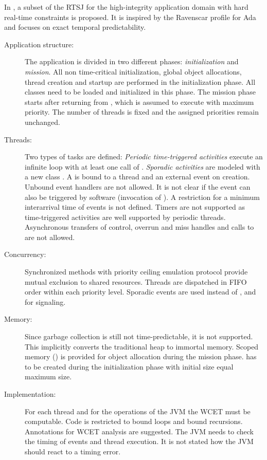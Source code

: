 In \cite{Pusch01}, a subset of the RTSJ for the high-integrity
application domain with hard real-time constraints is proposed. It
is inspired by the Ravenscar profile for Ada \cite{289525} and
focuses on exact temporal predictability.
%
\begin{description}
\item[Application structure:] The application is divided in two
different phases: \textit{initialization} and \textit{mission}. All
non time-critical initialization, global object allocations, thread
creation and startup are performed in the initialization phase. All
classes need to be loaded and initialized in this phase. The mission
phase starts after returning from , which is assumed to
execute with maximum priority. The number of threads is fixed and
the assigned priorities remain unchanged.

\item[Threads:] Two types of tasks are defined: \textit{Periodic
time-triggered activities} execute an infinite loop with at least
one call of . \textit{Sporadic activities}
are modeled with a new class . A
 is bound to a thread and an external event on
creation. Unbound event handlers are not allowed. It is not clear if
the event can also be triggered by software (invocation of
). A restriction for a minimum interarrival time of
events is not defined. Timers are not supported as time-triggered
activities are well supported by periodic threads. Asynchronous
transfers of control, overrun and miss handles and calls to
 are not allowed.

\item[Concurrency:] Synchronized methods with priority ceiling emulation protocol
provide mutual exclusion to shared resources. Threads are dispatched
in FIFO order within each priority level. Sporadic events are used
instead of ,  and  for
signaling.

\item[Memory:] Since garbage collection is still not
time-predictable, it is not supported. This implicitly converts the
traditional heap to immortal memory. Scoped memory ()
is provided for object allocation during the mission phase.
 has to be created during the initialization phase
with initial size equal maximum size.

\item[Implementation:] For each thread and for the operations
of the JVM the WCET must be computable. Code is restricted to bound
loops and bound recursions. Annotations for WCET analysis are
suggested. The JVM needs to check the timing of events and thread
execution. It is not stated how the JVM should react to a timing
error.

\end{description}

